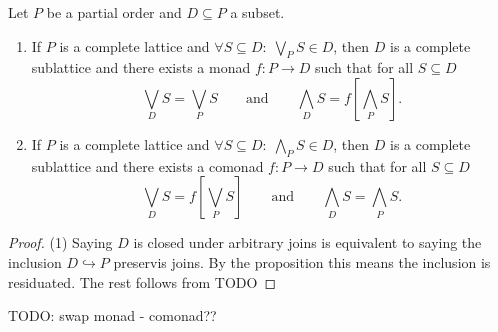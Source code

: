 \begin{corollary} \label{completeSublattice}
Let $P$ be a partial order and $D\subseteq P$ a subset.
\begin{enumerate}
\item If $P$ is a complete lattice and $\forall S\subseteq D:\; \bigvee_P S \in D$, then $D$ is a complete sublattice and there exists a monad $f: P\to D$ such that for all $S\subseteq D$
\[ \bigvee_D S = \bigvee_P S \qquad\text{and}\qquad \bigwedge_D S = f\left[\bigwedge_P S\right]. \]
\item If $P$ is a complete lattice and $\forall S\subseteq D:\; \bigwedge_P S \in D$, then $D$ is a complete sublattice and there exists a comonad $f: P\to D$ such that for all $S\subseteq D$
\[ \bigvee_D S = f\left[\bigvee_P S\right] \qquad\text{and}\qquad \bigwedge_D S = \bigwedge_P S. \]
\end{enumerate}
\end{corollary}
\begin{proof}
(1) Saying $D$ is closed under arbitrary joins is equivalent to saying the inclusion $D\hookrightarrow P$ preservis joins. By the proposition this means the inclusion is residuated. The rest follows from TODO
\end{proof}
TODO: swap monad - comonad??

